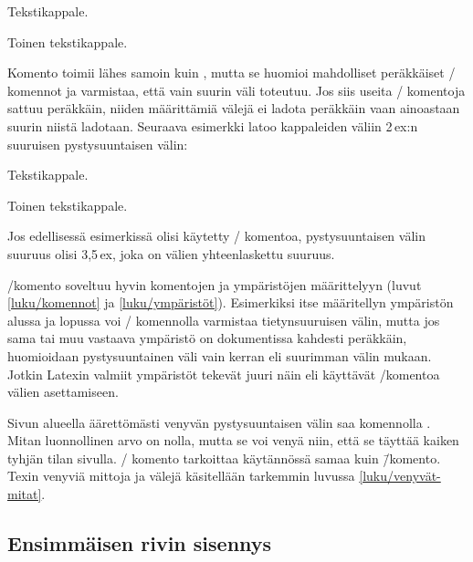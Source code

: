 \begin{koodilohkosis}
Tekstikappale.
\vspace{5ex plus 1ex minus .5ex}

Toinen tekstikappale.
\end{koodilohkosis}

Komento  toimii lähes samoin kuin ,
mutta se huomioi mahdolliset peräkkäiset \-/ komennot
ja varmistaa, että vain suurin väli toteutuu. Jos siis useita
\-/ komentoja sattuu peräkkäin, niiden määrittämiä
välejä ei ladota peräkkäin vaan ainoastaan suurin niistä ladotaan.
Seuraava esimerkki latoo kappaleiden väliin 2\,ex:n suuruisen
pystysuuntaisen välin:

\begin{koodilohkosis}
Tekstikappale.

\addvspace{1ex} \addvspace{2ex} \addvspace{.5ex}
Toinen tekstikappale.
\end{koodilohkosis}

Jos edellisessä esimerkissä olisi käytetty \-/ komentoa,
pystysuuntaisen välin suuruus olisi 3,5\,ex, joka on välien
yhteenlaskettu suuruus.

\-/komento soveltuu hyvin komentojen ja ympäristöjen
määrittelyyn (luvut \ref{luku/komennot} ja \ref{luku/ympäristöt}).
Esimerkiksi itse määritellyn ympäristön alussa ja lopussa voi
\-/ komennolla varmistaa tietynsuuruisen välin, mutta
jos sama tai muu vastaava ympäristö on dokumentissa kahdesti peräkkäin,
huomioidaan pystysuuntainen väli vain kerran eli suurimman välin mukaan.
Jotkin Latexin valmiit ympäristöt tekevät juuri näin eli käyttävät
\-/komentoa välien asettamiseen.

Sivun alueella äärettömästi venyvän pystysuuntaisen välin saa komennolla
. Mitan luonnollinen arvo on nolla, mutta se voi venyä
niin, että se täyttää kaiken tyhjän tilan sivulla. \-/
komento tarkoittaa käytännössä samaa kuin
 \=/komento. Texin venyviä
mittoja ja välejä käsitellään tarkemmin luvussa
\ref{luku/venyvät-mitat}.

\subsection{Ensimmäisen rivin sisennys}
\label{luku/ensimmäisen-rivin-sisennys}

